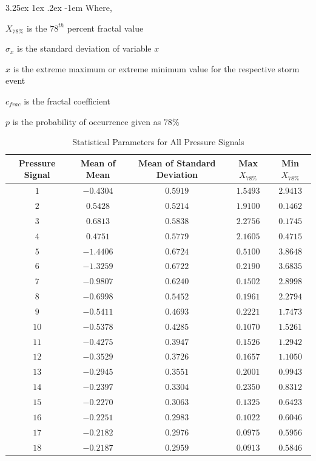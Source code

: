 \documentclass[11pt,a4paper,titlepage]{report}
\makeatletter
\renewcommand\paragraph{\@startsection{paragraph}{5}{\z@}%
  {3.25ex \@plus1ex \@minus.2ex}%
  {-1em}%
  {\normalfont\normalsize\bfseries}}
\makeatother
\begin{document}
\paragraph{}Where,
\begin{itemize}
    \begin{small}
    \item $X_{78\%}$ is the $78^{th}$ percent fractal value
    \item $\sigma_x$ is the standard deviation of variable $x$
    \item $x$ is the extreme maximum or extreme minimum value for the respective storm event
    \item $c_{frac}$ is the fractal coefficient
    \item $p$ is the probability of occurrence given as $78\%$
    \end{small}
\end{itemize}
\begin{table}[h]
    \centering
    \begin{tabular}{c|c|c|c|c}
     Pressure Signal & Mean of Mean & Mean of Standard Deviation & Max $X_{78\%}$ & Min $X_{78\%}$  \\
     \hline
      $1$ & $-0.4304$ & $0.5919$ & $1.5493$ & $2.9413$ \\
      $2$ & $0.5428$ & $0.5214$ & $1.9100$ & $0.1462$ \\
      $3$ & $0.6813$ & $0.5838$ & $2.2756$ & $0.1745$ \\
      $4$ & $0.4751$ & $0.5779$ & $2.1605$ & $0.4715$ \\
      $5$ & $-1.4406$ & $0.6724$ & $0.5100$ & $3.8648$ \\
      $6$ & $-1.3259$ & $0.6722$ & $0.2190$ & $3.6835$ \\
      $7$ & $-0.9807$ & $0.6240$ & $0.1502$ & $2.8998$ \\
      $8$ & $-0.6998$ & $0.5452$ & $0.1961$ & $2.2794$ \\
      $9$ & $-0.5411$ & $0.4693$ & $0.2221$ & $1.7473$ \\
      $10$ & $-0.5378$ & $0.4285$ & $0.1070$ & $1.5261$ \\
      $11$ & $-0.4275$ & $0.3947$ & $0.1526$ & $1.2942$ \\
      $12$ & $-0.3529$ & $0.3726$ & $0.1657$ & $1.1050$ \\
      $13$ & $-0.2945$ & $0.3551$ & $0.2001$ & $0.9943$ \\
      $14$ & $-0.2397$ & $0.3304$ & $0.2350$ & $0.8312$ \\
      $15$ & $-0.2270$ & $0.3063$ & $0.1325$ & $0.6423$ \\
      $16$ & $-0.2251$ & $0.2983$ & $0.1022$ & $0.6046$ \\
      $17$ & $-0.2182$ & $0.2976$ & $0.0975$ & $0.5956$ \\
      $18$ & $-0.2187$ & $0.2959$ & $0.0913$ & $0.5846$ \\
    \end{tabular}
    \caption{Statistical Parameters for All Pressure Signals}
    \label{tab:signal 1}
\end{table}
\end{document}
